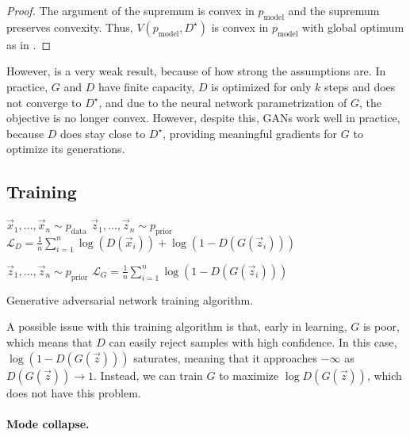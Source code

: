 \begin{proof}
    The argument of the supremum is convex in $p_{\mathrm{model}}$ and the supremum preserves
    convexity. Thus, $V(p_{\mathrm{model}}, D^\star)$ is convex in $p_{\mathrm{model}}$ with global
    optimum as in .
\end{proof}

However,  is a very weak result, because of how strong the assumptions
are. In practice, $G$ and $D$ have finite capacity, $D$ is optimized for only $k$ steps and does
not converge to $D^\star$, and due to the neural network parametrization of $G$, the objective is
no longer convex. However, despite this, GANs work well in practice, because $D$ does stay close to
$D^\star$, providing meaningful gradients for $G$ to optimize its generations.

\subsection{Training}

\begin{algorithm}
    \begin{algorithmic}[1]
        \State $\vec{x}_1, \ldots, \vec{x}_n \sim p_{\mathrm{data}}$
        \State $\vec{z}_1, \ldots, \vec{z}_n \sim p_{\mathrm{prior}}$
        \State $\mathcal{L}_D = \frac{1}{n} \sum_{i=1}^{n} \log (D(\vec{x}_i)) + \log(1 - D(G(\vec{z}_i)))$
        \End

        \State $\vec{z}_1, \ldots, \vec{z}_n \sim p_{\mathrm{prior}}$
        \State $\mathcal{L}_G = \frac{1}{n} \sum_{i=1}^{n} \log(1 - D(G(\vec{z}_i)))$
        \EndWhile
    \end{algorithmic}
    \caption{Generative adversarial network training algorithm.}
    \label{alg:gan}
\end{algorithm}

A possible issue with this training algorithm is that, early in learning, $G$ is poor, which means
that $D$ can easily reject samples with high confidence. In this case, $\log(1 - D(G(\vec{z})))$
saturates, meaning that it approaches $-\infty$ as $D(G(\vec{z})) \to 1$. Instead, we can train $G$
to maximize $\log D(G(\vec{z}))$, which does not have this problem.

\paragraph{Mode collapse.}

